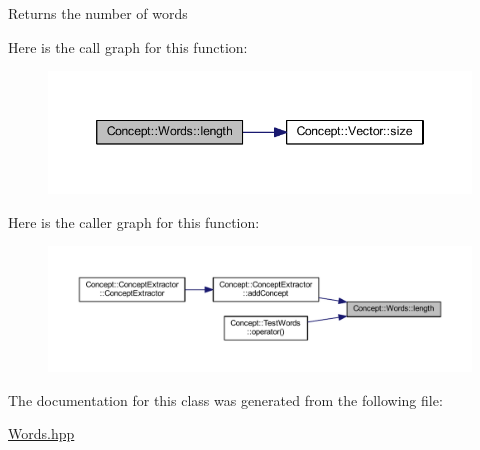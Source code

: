 \begin{DoxyReturn}{Returns}
the number of words 
\end{DoxyReturn}
Here is the call graph for this function\+:\nopagebreak
\begin{figure}[H]
\begin{center}
\leavevmode
\includegraphics[width=346pt]{class_concept_1_1_words_aecd76499829e2452564918a777ca8016_cgraph}
\end{center}
\end{figure}
Here is the caller graph for this function\+:\nopagebreak
\begin{figure}[H]
\begin{center}
\leavevmode
\includegraphics[width=350pt]{class_concept_1_1_words_aecd76499829e2452564918a777ca8016_icgraph}
\end{center}
\end{figure}


The documentation for this class was generated from the following file\+:\begin{DoxyCompactItemize}
\item 
\mbox{\hyperlink{_words_8hpp}{Words.\+hpp}}\end{DoxyCompactItemize}
